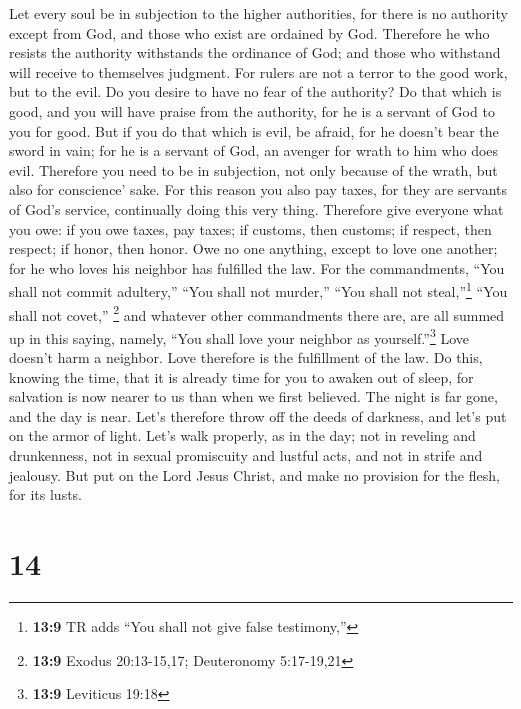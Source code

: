  Let every soul be in subjection to the higher
authorities, for there is no authority except from God, and those who
exist are ordained by God.  Therefore he who resists the
authority withstands the ordinance of God; and those who withstand will
receive to themselves judgment.  For rulers are not a
terror to the good work, but to the evil. Do you desire to have no fear
of the authority? Do that which is good, and you will have praise from
the authority,  for he is a servant of God to you for
good. But if you do that which is evil, be afraid, for he doesn't bear
the sword in vain; for he is a servant of God, an avenger for wrath to
him who does evil.  Therefore you need to be in
subjection, not only because of the wrath, but also for conscience'
sake.  For this reason you also pay taxes, for they are
servants of God's service, continually doing this very thing.
 Therefore give everyone what you owe: if you owe taxes,
pay taxes; if customs, then customs; if respect, then respect; if honor,
then honor.  Owe no one anything, except to love one
another; for he who loves his neighbor has fulfilled the law.
 For the commandments, ``You shall not commit adultery,''
``You shall not murder,'' ``You shall not steal,''\footnote{\textbf{13:9}
  TR adds ``You shall not give false testimony,''} ``You shall not
covet,'' \footnote{\textbf{13:9} Exodus 20:13-15,17; Deuteronomy
  5:17-19,21} and whatever other commandments there are, are all summed
up in this saying, namely, ``You shall love your neighbor as
yourself.''\footnote{\textbf{13:9} Leviticus 19:18}  Love
doesn't harm a neighbor. Love therefore is the fulfillment of the law.
 Do this, knowing the time, that it is already time for
you to awaken out of sleep, for salvation is now nearer to us than when
we first believed.  The night is far gone, and the day is
near. Let's therefore throw off the deeds of darkness, and let's put on
the armor of light.  Let's walk properly, as in the day;
not in reveling and drunkenness, not in sexual promiscuity and lustful
acts, and not in strife and jealousy.  But put on the
Lord Jesus Christ, and make no provision for the flesh, for its lusts.

\hypertarget{section-13}{%
\section{14}\label{section-13}}

